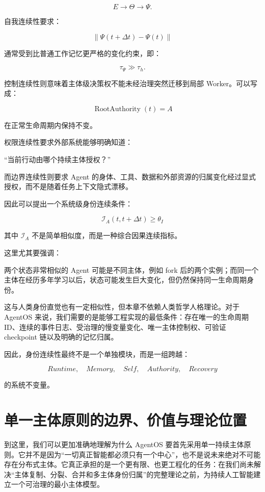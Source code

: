 \[
E
\rightarrow
\Theta
\rightarrow
\Psi.
\]

自我连续性要求：

\[
\|\Psi(t+\Delta t)-\Psi(t)\|
\]

通常受到比普通工作记忆更严格的变化约束，即：

\[
\tau_\Psi
\gg
\tau_h.
\]

控制连续性则意味着主体级决策权不能未经治理突然迁移到局部 Worker。可以写成：

\[
\operatorname{RootAuthority}(t)
=
A
\]

在正常生命周期内保持不变。

权限连续性要求外部系统能够明确知道：

“当前行动由哪个持续主体授权？”

而边界连续性则要求 Agent 的身体、工具、数据和外部资源的归属变化经过显式授权，而不是随着任务上下文隐式漂移。

因此可以提出一个系统级身份连续条件：

\[
\boxed{
\mathcal I_A(t,t+\Delta t)
\geq
\theta_I
}
\]

其中 $\mathcal I_A$ 不是简单相似度，而是一种综合因果连续指标。

这里尤其要强调：

\begin{statementbox}
\centering
{}
\end{statementbox}

两个状态非常相似的 Agent 可能是不同主体，例如 fork 后的两个实例；而同一个主体在经历多年学习以后，状态可能发生巨大变化，但仍然保持同一生命周期身份。

这与人类身份直觉也有一定相似性，但本章不依赖人类哲学人格理论。对于 AgentOS 来说，我们需要的是能够工程实现的最低条件：存在唯一的生命周期 ID、连续的事件日志、受治理的慢变量变化、唯一主体控制权、可验证 checkpoint 链以及明确的记忆归属。

因此，身份连续性最终不是一个单独模块，而是一组跨越：

\[
Runtime,
\quad
Memory,
\quad
Self,
\quad
Authority,
\quad
Recovery
\]

的系统不变量。

\section{单一主体原则的边界、价值与理论位置}

到这里，我们可以更加准确地理解为什么 AgentOS 要首先采用单一持续主体原则。它并不是因为“一切真正智能都必须只有一个中心”，也不是说未来绝对不可能存在分布式主体。它真正承担的是一个更有限、也更工程化的任务：在我们尚未解决“主体复制、分裂、合并和多主体身份归属”的完整理论之前，为持续人工智能建立一个可治理的最小主体模型。

